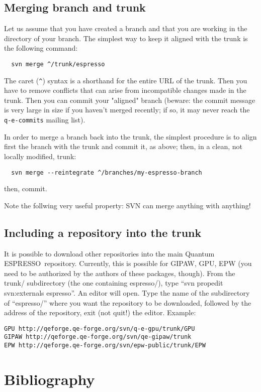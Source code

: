 \documentclass[12pt,a4paper]{article}
\def\qe{{\sc Quantum ESPRESSO}}
\begin{document}
\subsection{Merging branch and trunk}
\label{SubSec:Merge}
Let us assume that you have created a branch and that you are working
in the directory of your branch. The simplest way to keep it aligned 
with the trunk is the following command:
\begin{verbatim}
  svn merge ^/trunk/espresso
\end{verbatim}
The caret (\texttt{\^}) syntax is a shorthand for the entire URL of the trunk.
Then you have to remove conflicts that can arise from incompatible changes 
made in the trunk. Then you can commit your "aligned" branch (beware:
the commit message is very large in size if you haven't merged recently;
if so, it may never reach the \texttt{q-e-commits} mailing list).

In order to merge a branch back into the trunk, the simplest procedure is
to align first the branch with the trunk and commit it, as above; then,
in a clean, not locally modified, trunk: 
\begin{verbatim}
  svn merge --reintegrate ^/branches/my-espresso-branch
\end{verbatim}
then, commit.

Note the follwing very useful property: SVN can merge anything with anything!

\subsection{Including a repository into the trunk}
\label{SubSec:propedit}
It is possible to download other repositories into the main \qe\ repository. 
Currently, this is possible for GIPAW, GPU, EPW (you need to be authorized
by the authors of these packages, though). From the trunk/ subdirectory
(the one containing espresso/), type ``svn propedit svn:externals espresso''.
An editor will open. Type the name of the subdirectory of ``espresso/''
where you want the repository to be downloaded, followed by the address of
the repository, exit (not quit!) the editor. Example:
\begin{verbatim}
GPU http://qeforge.qe-forge.org/svn/q-e-gpu/trunk/GPU
GIPAW http://qeforge.qe-forge.org/svn/qe-gipaw/trunk
EPW http://qeforge.qe-forge.org/svn/epw-public/trunk/EPW
\end{verbatim}

\section{Bibliography}
\end{document}
